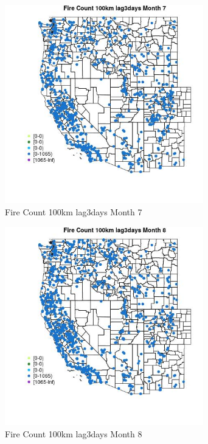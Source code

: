 \begin{figure} 
\centering  
\includegraphics[width=0.77\textwidth]{Code_Outputs/Report_ML_input_PM25_Step4_part_f_de_duplicated_aveswNAs_MapObsMo7Fire_Count_100km_lag3days.jpg} 
\caption{\label{fig:Report_ML_input_PM25_Step4_part_f_de_duplicated_aveswNAsMapObsMo7Fire_Count_100km_lag3days}Fire Count 100km lag3days Month 7} 
\end{figure} 
 

\begin{figure} 
\centering  
\includegraphics[width=0.77\textwidth]{Code_Outputs/Report_ML_input_PM25_Step4_part_f_de_duplicated_aveswNAs_MapObsMo8Fire_Count_100km_lag3days.jpg} 
\caption{\label{fig:Report_ML_input_PM25_Step4_part_f_de_duplicated_aveswNAsMapObsMo8Fire_Count_100km_lag3days}Fire Count 100km lag3days Month 8} 
\end{figure} 
 

